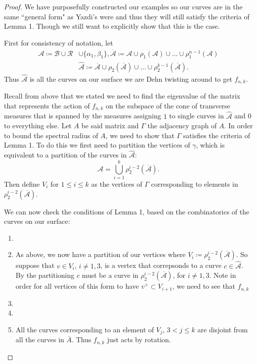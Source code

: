 \begin{proof}
We have purposefully constructed our examples so our curves are in the same ``general form" as Yazdi's were and thus they will still satisfy the criteria of Lemma 1. Though we still want to explicitly show that this is the case.

First for consistency of notation, let
\begin{align*}
    \mathcal{A} \coloneqq \mathcal{B} \cup \mathcal{R} &\cup \{\alpha_1,\beta_1\}, \overline{\mathcal{A}} \coloneqq \mathcal{A} \cup \rho_1(\mathcal{A}) \cup \dots \cup \rho_1^{n-1}(\mathcal{A}) \\
    &\hat{\mathcal{A}} \coloneqq \overline{\mathcal{A}} \cup \rho_2(\overline{\mathcal{A}}) \cup \dots \cup \rho_2^{k-1}(\overline{\mathcal{A}}).
\end{align*}
Thus $\hat{\mathcal{A}}$ is all the curves on our surface we are Dehn twisting around to get $f_{n,k}$.

Recall from above that we stated we need to find the eigenvalue of the matrix that represents the action of $f_{n,k}$ on the subspace of the cone of transverse measures that is spanned by the measures assigning $1$ to single curves in $\hat{\mathcal{A}}$ and 0 to everything else. Let $A$ be said matrix and $\Gamma$ the adjacency graph of $A$. In order to bound the spectral radius of $A$, we need to show that $\Gamma$ satisfies the criteria of Lemma 1. To do this we first need to partition the vertices of $\gamma$, which is equivalent to a partition of the curves in $\hat{\mathcal{A}}$: $$\mathcal{A} = \bigcup_{i=1}^k \rho_2^{i-2}(\overline{\mathcal{A}}).$$ Then define $V_i$ for $1 \leq i \leq k$ as the vertices of $\Gamma$ corresponding to elements in $\rho_2^{i-2}(\overline{\mathcal{A}})$.

We can now check the conditions of Lemma 1, based on the combinatorics of the curves on our surface:
\begin{enumerate}
    \item
    \item As above, we now have a partition of our vertices where $V_i \coloneqq \rho_2^{i-2}(\overline{\mathcal{A}})$. So suppose that $v \in V_i$, $i \neq 1,3$, is a vertex that correpsonds to a curve $c \in \hat{\mathcal{A}}$. By the partitioning $c$ must be a curve in $\rho_2^{i-2}(\overline{\mathcal{A}})$, for $i \neq 1,3$. Note in order for all vertices of this form to have $v^+ \subset V_{i+1}$, we need to see that $f_{n,k}$  
    \item
    \item
    \item All the curves corresponding to an element of $V_j$, $3 < j \leq k$ are disjoint from all the curves in $\overline{A}$. Thus $f_{n,k}$ just acts by rotation.
\end{enumerate}


\end{proof}
